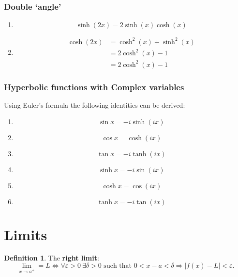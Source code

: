 \documentclass[12pt, a4paper]{article}
\theoremstyle{definition}
\newtheorem{definition}{Definition}[section]
\theoremstyle{plain}
\begin{document}
\subsubsection*{Double `angle'}

\begin{enumerate}
	
	\item $$\sinh(2x)=2\sinh(x)\cosh(x)$$

	\item $$\begin{aligned}
	\cosh(2x)&=\cosh^2(x)+\sinh^2(x) \\
			&=2\cosh^2(x)-1 \\
			&=2\cosh^2(x)-1
	\end{aligned}$$

\end{enumerate}

\subsubsection{Hyperbolic functions with Complex variables}

Using Euler's formula the following identities can be derived: 

\begin{enumerate}

	\item $$\sin{x} = -i\sinh(ix)$$

	\item $$\cos{x} = \cosh(ix)$$

	\item $$\tan{x} = -i\tanh(ix)$$

	\item $$\sinh{x} = -i\sin(ix)$$

	\item $$\cosh{x} = \cos(ix)$$

	\item$$\tanh{x} = -i\tan(ix)$$

\end{enumerate}

\section{Limits}

\begin{definition}
The \textbf{right limit}: $$\lim_{x \to a^+} = L \iff \forall \varepsilon>0 \ \exists \delta>0 \text{ such that } 0<x-a<\delta \Rightarrow|f(x)-L|<\varepsilon.$$
\end{definition}
\end{document}
